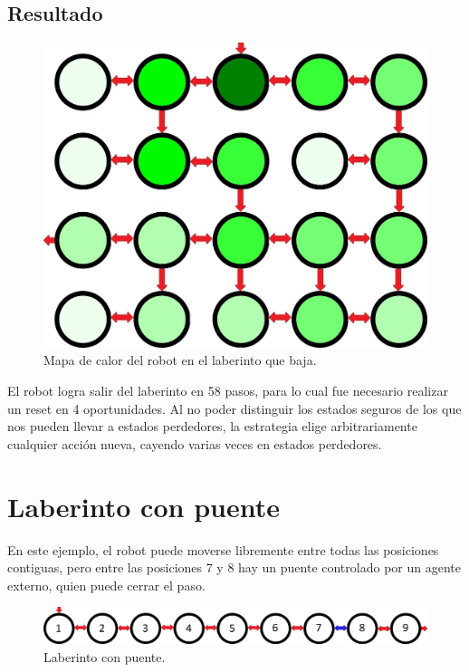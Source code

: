 \clearpage

\subsection{Resultado}

\begin{figure}[H]
	\centering
		\includegraphics[scale=0.2]{Imagenes/Laberintos/down_calor.png}
	\caption{Mapa de calor del robot en el laberinto que baja.}
	\label{fig:down_calor}
\end{figure}

El robot logra salir del laberinto en 58 pasos, para lo cual fue necesario realizar un reset en 4 oportunidades. 
Al no poder distinguir los estados seguros de los que nos pueden llevar a estados perdedores, la estrategia elige arbitrariamente 
cualquier acción nueva, cayendo varias veces en estados perdedores.

\clearpage

\section{Laberinto con puente}

En este ejemplo, el robot puede moverse libremente entre todas las posiciones contiguas, pero entre las posiciones 7 y 8 hay un puente 
controlado por un agente externo, quien puede cerrar el paso.

\begin{figure}[H]
	\centering
		\includegraphics[width=1.0\textwidth]{Imagenes/Laberintos/puente.jpg}
	\caption{Laberinto con puente.}
	\label{fig:puente}
\end{figure}

